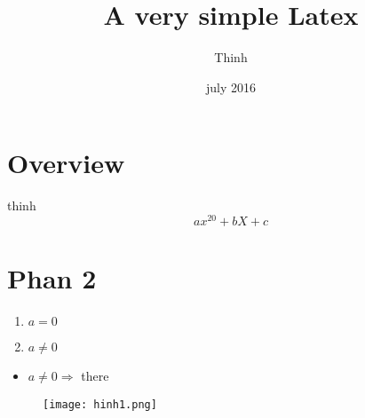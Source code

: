 \documentclass{article}
\title{A very simple Latex}
\author{Thinh}
\date{july 2016}
\begin{document}
	\maketitle
	\section{Overview}
	\label{sec:phan 1}
	thinh
	\begin{equation*}
		ax^{20}+bX+c
	\end{equation*}
	
	\section{Phan 2}
	\label{sec:phan 2}
	\begin{enumerate}
		\item $a =0$
		\item $a \neq 0$
	\end{enumerate}
	\begin{itemize}
		\item $a \neq 0  \Rightarrow$ there
		
	\end{itemize}
	\begin{figure}
		\texttt{[image: hinh1.png]}
	\end{figure}
	
	
\end{document}
